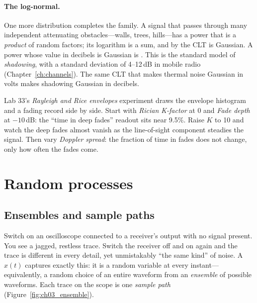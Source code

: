 \paragraph{The log-normal.} One more distribution completes the family. A signal that passes
through many independent attenuating obstacles---walls, trees, hills---has a power that is a
\emph{product} of random factors; its logarithm is a sum, and by the CLT is Gaussian. A power whose
value in decibels is Gaussian is . This is the standard model of
\emph{shadowing}, with a standard deviation of 4--12\,dB in mobile radio
(Chapter~\ref{ch:channels}). The same CLT that makes thermal noise Gaussian in volts makes
shadowing Gaussian in decibels.

\begin{tryit}
Lab 33's \emph{Rayleigh and Rice envelopes} experiment draws the envelope histogram and a fading
record side by side. Start with \emph{Rician K-factor} at 0 and \emph{Fade depth} at $-10$\,dB: the
``time in deep fades'' readout sits near 9.5\%. Raise $K$ to 10 and watch the deep fades almost
vanish as the line-of-sight component steadies the signal. Then vary \emph{Doppler spread}: the
fraction of time in fades does not change, only how often the fades come.
\end{tryit}

\section{Random processes}
\label{sec:ch03:processes}

\subsection{Ensembles and sample paths}

Switch on an oscilloscope connected to a receiver's output with no signal present. You see a
jagged, restless trace. Switch the receiver off and on again and the trace is different in every
detail, yet unmistakably ``the same kind'' of noise. A  $x(t)$ captures exactly
this: it is a random variable at every instant---equivalently, a random choice of an entire waveform
from an \emph{ensemble} of possible waveforms. Each trace on the scope is one \emph{sample path}
(Figure~\ref{fig:ch03_ensemble}).


